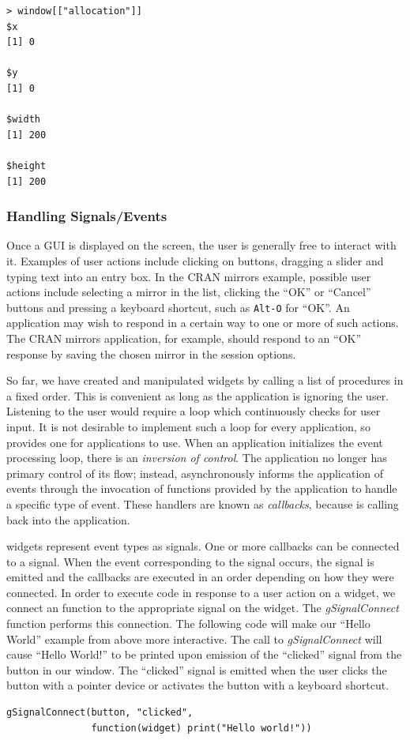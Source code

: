 \documentclass[article]{jss}
\begin{document}
\begin{verbatim}
> window[["allocation"]]
$x
[1] 0

$y
[1] 0

$width
[1] 200

$height
[1] 200
\end{verbatim}

\subsubsection{Handling Signals/Events}

Once a GUI is displayed on the screen, the user is 
generally free to interact with it. Examples of user actions include 
clicking on buttons, dragging a slider and typing text into an entry
box.
In the CRAN mirrors example, possible user actions include
selecting a mirror in the list, clicking the ``OK'' or ``Cancel''
buttons 
and pressing a keyboard shortcut, such as \texttt{Alt-O} for ``OK''. 
An application may wish to respond in a certain way to one or more of
such actions.
The CRAN mirrors application, for example, should respond to an ``OK''
response
by saving the chosen mirror in the session options.

So far, we have created and manipulated widgets by calling a list
of procedures in a fixed order. This is convenient as long as the
application
is ignoring the user. Listening to the user would
require a loop which continuously checks for user input.
It is not desirable to implement such a loop for every application, so
 provides one for applications to use. When an application
initializes the  event processing loop, there is an 
\emph{inversion of control}. The application no longer has primary
control
of its flow; instead,  asynchronously informs the
application of 
events through the invocation of functions provided by the application
to 
handle a specific type of event. These handlers are known as 
\emph{callbacks}, because  is calling back into the
application. 

 widgets represent event types as signals. One or more
callbacks can be connected to a signal. When the event corresponding
to the
signal occurs, the signal is emitted and the callbacks are executed in
an order
depending on how they were connected. In order to execute 
code in 
response to a user action on a widget, we connect an 
function to the 
appropriate signal on the widget.  The \emph{gSignalConnect} function 
performs this connection. The following code will make our ``Hello
World'' 
example from above more interactive.
The call to \emph{gSignalConnect} will cause ``Hello World!'' to be
printed 
upon emission of the ``clicked'' signal from the button in our window.
The 
``clicked'' signal is emitted when the user clicks the button with a
pointer
device or activates the button with a keyboard shortcut.
\begin{verbatim}
gSignalConnect(button, "clicked", 
               function(widget) print("Hello world!"))
\end{verbatim}
\end{document}
